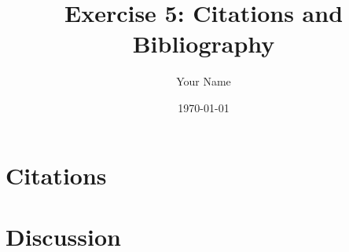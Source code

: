 \documentclass{article}
\title{Exercise 5: Citations and Bibliography}
\author{Your Name}
\date{\today}
\begin{document}
\maketitle

\section{Citations}

\section{Discussion}



\end{document}

